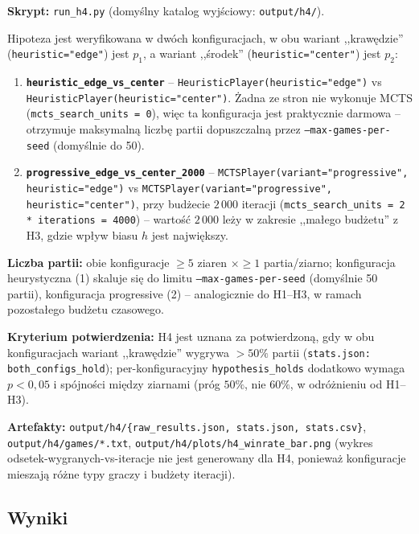 \documentclass[11pt,a4paper]{article}
\begin{document}
\textbf{Skrypt:} \texttt{run\_h4.py} (domyślny katalog wyjściowy:
\texttt{output/h4/}).

Hipoteza jest weryfikowana w dwóch konfiguracjach, w obu wariant
,,krawędzie'' (\texttt{heuristic="edge"}) jest $p_1$, a wariant ,,środek''
(\texttt{heuristic="center"}) jest $p_2$:

\begin{enumerate}
    \item \textbf{\texttt{heuristic\_edge\_vs\_center}} --
        \texttt{HeuristicPlayer(heuristic="edge")} vs
        \texttt{HeuristicPlayer(heuristic="center")}. Żadna ze stron nie
        wykonuje MCTS (\texttt{mcts\_search\_units = 0}), więc ta
        konfiguracja jest praktycznie darmowa -- otrzymuje maksymalną
        liczbę partii dopuszczalną przez \texttt{--max-games-per-seed}
        (domyślnie do 50).
    \item \textbf{\texttt{progressive\_edge\_vs\_center\_2000}} --
        \texttt{MCTSPlayer(variant="progressive", heuristic="edge")} vs
        \texttt{MCTSPlayer(variant="progressive", heuristic="center")},
        przy budżecie $2\,000$ iteracji (\texttt{mcts\_search\_units =
        2 * iterations = 4000}) -- wartość $2\,000$ leży w zakresie
        ,,małego budżetu'' z H3, gdzie wpływ biasu $h$ jest największy.
\end{enumerate}

\textbf{Liczba partii:} obie konfiguracje $\geq 5$ ziaren $\times \geq 1$
partia/ziarno; konfiguracja heurystyczna (1) skaluje się do limitu
\texttt{--max-games-per-seed} (domyślnie 50 partii), konfiguracja
progressive (2) -- analogicznie do H1--H3, w ramach pozostałego budżetu
czasowego.

\textbf{Kryterium potwierdzenia:} H4 jest uznana za potwierdzoną, gdy w
obu konfiguracjach wariant ,,krawędzie'' wygrywa $> 50\%$ partii
(\texttt{stats.json: both\_configs\_hold}); per-konfiguracyjny
\texttt{hypothesis\_holds} dodatkowo wymaga $p < 0{,}05$ i spójności
między ziarnami (próg $50\%$, nie $60\%$, w odróżnieniu od H1--H3).

\textbf{Artefakty:}
\texttt{output/h4/\{raw\_results.json, stats.json, stats.csv\}},
\texttt{output/h4/games/*.txt},
\texttt{output/h4/plots/h4\_winrate\_bar.png} (wykres
odsetek-wygranych-vs-iteracje nie jest generowany dla H4, ponieważ
konfiguracje mieszają różne typy graczy i budżety iteracji).

\subsection{Wyniki}
\end{document}
